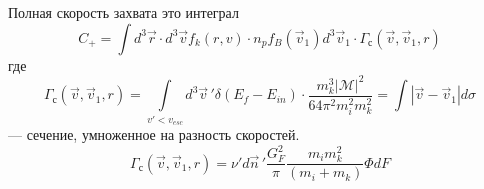 	Полная скорость захвата это интеграл
	\begin{equation*}
		\label{eq:capture_rate}
		C_{+} = {\int{d^{3}\vec{r} \cdot d^{3}\vec{v}f_{k}\left( {r,v} \right) \cdot n_{p}f_{B}\left( {\vec{v}}_{1} \right)d^{3}{\vec{v}}_{1} \cdot \Gamma_{с}\left( \vec{v},{\vec{v}}_{1},r \right)}}
	\end{equation*}
	где
	\begin{equation*}
		\label{eq:Gamma_def}
		\Gamma_{с}\left( {\vec{v},{\vec{v}}_{1},r} \right) = {\int\limits_{v' < v_{esc}}{d^{3}{\vec{v}}\,'\delta\left( {E_{f} - E_{in}} \right) \cdot \frac{m_{k}^{3}\left| \mathcal{M} \right|^{2}}{64\pi^{2}m_{i}^{2}m_{k}^{2}}}} = 
		\int{ |\vec{v}-\vec{v}_1|d\sigma }
	\end{equation*}
	--- сечение, умноженное на разность скоростей.
	\begin{equation*}
		\Gamma_{с}\left( {\vec{v},{\vec{v}}_{1},r} \right) = \nu' d\vec{n}\,'\frac{G_{F}^{2}}{\pi}\frac{m_i m_{k}^{2}}{\left( m_{i} + m_{k} \right)}\Phi dF
	\end{equation*}
